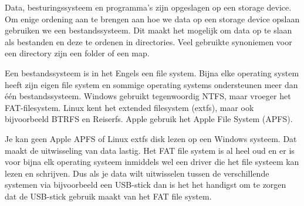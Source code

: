 Data, besturingssysteem en programma's zijn opgeslagen op een storage device. Om enige ordening aan te brengen aan hoe we data op een storage device opslaan gebruiken we een bestandssysteem. Dit maakt het mogelijk om data op te slaan als bestanden en deze te ordenen in directories. Veel gebruikte synoniemen voor een directory zijn een folder of een map.

Een bestandssysteem is in het Engels een file system. Bijna elke operating system heeft zijn eigen file system en sommige operating systems ondersteunen meer dan \'e\'en bestandssysteem. Windows gebruikt tegenwoordig NTFS, maar vroeger het FAT-filesystem. Linux kent het extended filesystem (extfs), maar ook bijvoorbeeld BTRFS en Reiserfs. Apple gebruik het Apple File System (APFS).

Je kan geen Apple APFS of Linux extfs disk lezen op een Windows systeem. Dat maakt de uitwisseling van data lastig. Het FAT file system is al heel oud en er is voor bijna elk operating systeem inmiddels wel een driver die het file systeem kan lezen en schrijven. Dus als je data wilt uitwisselen tussen de verschillende systemen via bijvoorbeeld een USB-stick dan is het het handigst om te zorgen dat de USB-stick gebruik maakt van het FAT file system.





